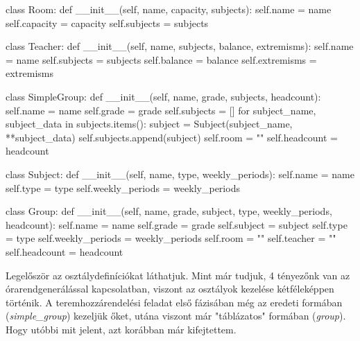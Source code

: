 \documentclass[a4paper,12pt]{article}
\begin{document}
\begin{python}
class Room:
    def __init__(self, name, capacity, subjects):
        self.name = name
        self.capacity = capacity
        self.subjects = subjects


class Teacher:
    def __init__(self, name, subjects, balance, extremisms):
        self.name = name
        self.subjects = subjects
        self.balance = balance
        self.extremisms = extremisms


class SimpleGroup:
    def __init__(self, name, grade, subjects, headcount):
        self.name = name
        self.grade = grade
        self.subjects = []
        for subject_name, subject_data in subjects.items():
            subject = Subject(subject_name, **subject_data)
            self.subjects.append(subject)
        self.room = ""
        self.headcount = headcount


class Subject:
    def __init__(self, name, type, weekly_periods):
        self.name = name
        self.type = type
        self.weekly_periods = weekly_periods


class Group:
    def __init__(self, name, grade, subject, type, weekly_periods, headcount):
        self.name = name
        self.grade = grade
        self.subject = subject
        self.type = type
        self.weekly_periods = weekly_periods
        self.room = ""
        self.teacher = ""
        self.headcount = headcount
\end{python}

Legelőször az osztálydefiníciókat láthatjuk. Mint már tudjuk, 4 tényezőnk van az órarendgenerálással kapcsolatban, viszont az osztályok kezelése kétféleképpen történik. A teremhozzárendelési feladat első fázisában még az eredeti formában (\textsl{simple_group}) kezeljük őket, utána viszont már "táblázatos" formában (\textsl{group}). Hogy utóbbi mit jelent, azt korábban már kifejtettem.
\end{document}
